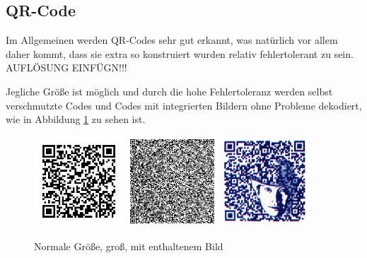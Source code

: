 \subsection*{QR-Code}
Im Allgemeinen werden QR-Codes sehr gut erkannt, was natürlich vor allem daher kommt, dass sie extra so konstruiert wurden relativ fehlertolerant zu sein.
AUFLÖSUNG EINFÜGN!!!

Jegliche Größe ist möglich und durch die hohe Fehlertoleranz werden selbst verschmutzte Codes und Codes mit integrierten Bildern ohne Probleme dekodiert, wie in Abbildung \ref*{fig:qrnormal} zu sehen ist.

\begin{figure}[H]
  \centering
  \includegraphics[width=0.3\textwidth]{img/QR/perfect_03.jpg}
  \includegraphics[width=0.3\textwidth]{img/QR/perfect_02.png}
  \includegraphics[width=0.3\textwidth]{img/QR/perfect_04.jpg}
  \caption{Normale Größe, groß, mit enthaltenem Bild}
  \label{fig:qrnormal}
\end{figure}

